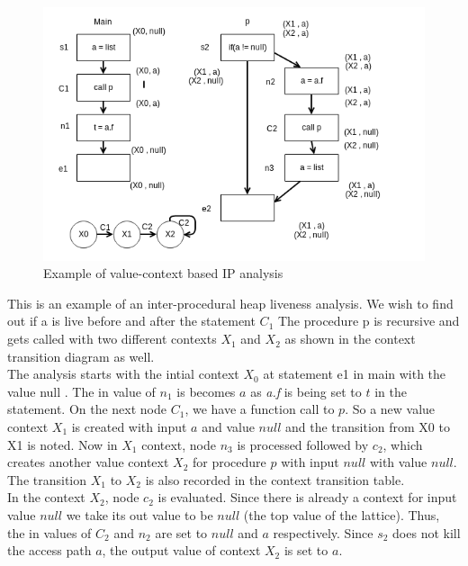 \begin{figure}[here]
	\begin{center}
		\includegraphics[scale=0.5]{Figures/interproc_example.png}
	\end{center}
	\caption{Example of value-context based IP analysis}
	\label{fig:extreme}
\end{figure}

This is an example of an inter-procedural heap liveness analysis. We wish to find out if a is live before and after the statement $C_1$ The procedure p is recursive and gets called with two different contexts $X_1$ and $X_2$ as shown in the context transition diagram as well. \\ 

The analysis starts with the intial context $X_0$ at statement e1 in main with the value null . The in value of $n_1$ is becomes $a$ as \emph{a.f} is being set to $t$ in the statement. On the next node $C_1$, we have a function call to $p$. So a new value context $X_1$ is created with input $a$ and value $null$ and the transition from X0 to X1 is noted. Now in $X_1$ context, node $n_3$ is processed followed by $c_2$, which creates another value context $X_2$ for procedure $p$ with input $null$ with value $null$. The transition $X_1$ to $X_2$ is also recorded in the context transition table. \\

In the context $X_2$, node $c_2$ is evaluated. Since there is already a context for input value $null$ we take its out value to be $null$ (the top value of the lattice). Thus, the in values of $C_2$ and $n_2$ are set to $null$ and $a$ respectively. Since $s_2$ does not kill the access path $a$, the output value of context $X_2$ is set to $a$. \\

